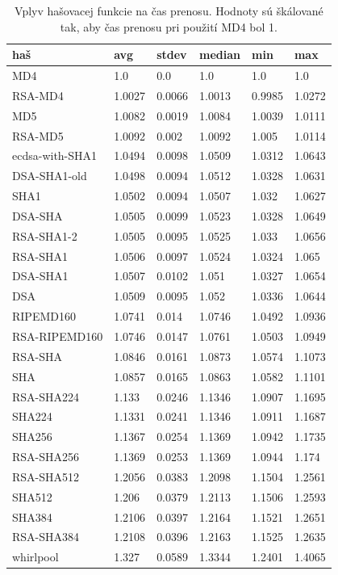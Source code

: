 \documentclass[12pt,a4paper]{article}
\begin{document}
\begin{table}\centering
    \caption{Vplyv hašovacej funkcie na čas prenosu. Hodnoty sú škálované
    tak, aby čas prenosu pri použití MD4 bol 1.}
    \label{tbl:digest-comparison}
    \begin{tabular}{|l||l|l|l|l|l|}
        \hline
        \bf haš & \bf  avg & \bf stdev & \bf median & \bf min & \bf max \\ \hline 
        MD4 & 1.0 & 0.0 & 1.0 & 1.0 & 1.0 \\ \hline
        RSA-MD4 & 1.0027 & 0.0066 & 1.0013 & 0.9985 & 1.0272 \\ \hline
        MD5 & 1.0082 & 0.0019 & 1.0084 & 1.0039 & 1.0111 \\ \hline
        RSA-MD5 & 1.0092 & 0.002 & 1.0092 & 1.005 & 1.0114 \\ \hline
        ecdsa-with-SHA1 & 1.0494 & 0.0098 & 1.0509 & 1.0312 & 1.0643 \\ \hline
        DSA-SHA1-old & 1.0498 & 0.0094 & 1.0512 & 1.0328 & 1.0631 \\ \hline
        SHA1 & 1.0502 & 0.0094 & 1.0507 & 1.032 & 1.0627 \\ \hline
        DSA-SHA & 1.0505 & 0.0099 & 1.0523 & 1.0328 & 1.0649 \\ \hline
        RSA-SHA1-2 & 1.0505 & 0.0095 & 1.0525 & 1.033 & 1.0656 \\ \hline
        RSA-SHA1 & 1.0506 & 0.0097 & 1.0524 & 1.0324 & 1.065 \\ \hline
        DSA-SHA1 & 1.0507 & 0.0102 & 1.051 & 1.0327 & 1.0654 \\ \hline
        DSA & 1.0509 & 0.0095 & 1.052 & 1.0336 & 1.0644 \\ \hline
        RIPEMD160 & 1.0741 & 0.014 & 1.0746 & 1.0492 & 1.0936 \\ \hline
        RSA-RIPEMD160 & 1.0746 & 0.0147 & 1.0761 & 1.0503 & 1.0949 \\ \hline
        RSA-SHA & 1.0846 & 0.0161 & 1.0873 & 1.0574 & 1.1073 \\ \hline
        SHA & 1.0857 & 0.0165 & 1.0863 & 1.0582 & 1.1101 \\ \hline
        RSA-SHA224 & 1.133 & 0.0246 & 1.1346 & 1.0907 & 1.1695 \\ \hline
        SHA224 & 1.1331 & 0.0241 & 1.1346 & 1.0911 & 1.1687 \\ \hline
        SHA256 & 1.1367 & 0.0254 & 1.1369 & 1.0942 & 1.1735 \\ \hline
        RSA-SHA256 & 1.1369 & 0.0253 & 1.1369 & 1.0944 & 1.174 \\ \hline
        RSA-SHA512 & 1.2056 & 0.0383 & 1.2098 & 1.1504 & 1.2561 \\ \hline
        SHA512 & 1.206 & 0.0379 & 1.2113 & 1.1506 & 1.2593 \\ \hline
        SHA384 & 1.2106 & 0.0397 & 1.2164 & 1.1521 & 1.2651 \\ \hline
        RSA-SHA384 & 1.2108 & 0.0396 & 1.2163 & 1.1525 & 1.2635 \\ \hline
        whirlpool & 1.327 & 0.0589 & 1.3344 & 1.2401 & 1.4065 \\ \hline
    \end{tabular}
\end{table}
\end{document}
